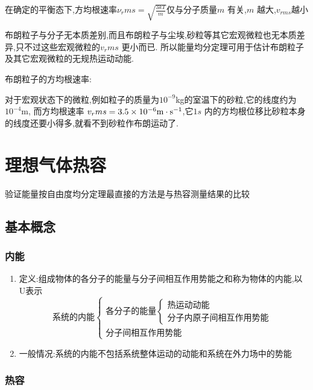 \documentclass{article}
\begin{document}
在确定的平衡态下,方均根速率$\nu_rms=\sqrt{\frac{3kT}m}$仅与分子质量$m$ 有关,$m$ 越大,$v_{rms}$越小

布朗粒子与分子无本质差别,而且布朗粒子与尘埃,砂粒等其它宏观微粒也无本质差异,只不过这些宏观微粒的$v_rms$ 更小而已.
所以能量均分定理可用于估计布朗粒子及其它宏观微粒的无规热运动动能.

布朗粒子的方均根速率:

对于宏观状态下的微粒,例如粒子的质量为$10^{-9} $kg的室温下的砂粒,它的线度约为$10^{-4} $m,
而方均根速率 $v_rms=3.5\times 10^{-6} \rm{m}\cdot \rm{s}^{-1}$,它$1s$ 内的方均根位移比砂粒本身的线度还要小得多,就看不到砂粒作布朗运动了.

\newpage

\section{理想气体热容}

验证能量按自由度均分定理最直接的方法是与热容测量结果的比较

\subsection{基本概念}

\subsubsection{内能}

\begin{enumerate}
    \item 定义:组成物体的各分子的能量与分子间相互作用势能之和称为物体的内能,以U表示
    $$\text{系统的内能}\left\{\begin{array}{l}\text{各分子的能量}\left\{\begin{array}{l}\text{热运动动能}\\\text{分子内原子间相互作用势能}\end{array}\right.\\\text{分子间相互作用势能}\end{array}\right.$$
    \item 一般情况:系统的内能不包括系统整体运动的动能和系统在外力场中的势能
\end{enumerate}

\subsubsection{热容}
\end{document}
